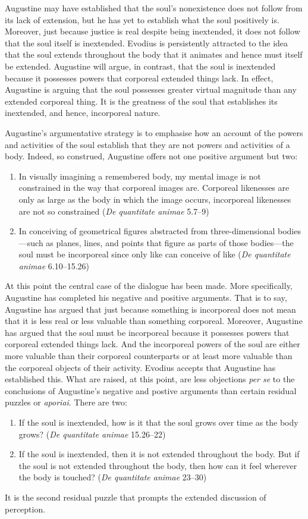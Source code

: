 \documentclass[12pt]{article}
\begin{document}
Augustine may have established that the soul’s nonexistence does not follow from its lack of extension, but he has yet to establish what the soul positively is. Moreover, just because justice is real despite being inextended, it does not follow that the soul itself is inextended. Evodius is persistently attracted to the idea that the soul extends throughout the body that it animates and hence must itself be extended. Augustine will argue, in contrast, that the soul is inextended because it possesses powers that corporeal extended things lack. In effect, Augustine is arguing that the soul possesses greater virtual magnitude than any extended corporeal thing. It is the greatness of the soul that establishes its inextended, and hence, incorporeal nature.

Augustine’s argumentative strategy is to emphasise how an account of the powers and activities of the soul establish that they are not powers and activities of a body. Indeed, so construed, Augustine offers not one positive argument but two:
\begin{enumerate}
	\item In visually imagining a remembered body, my mental image is not constrained in the way that corporeal images are. Corporeal likenesses are only as large as the body in which the image occurs, incorporeal likenesses are not so constrained (\emph{De quantitate animae} 5.7–9)
	\item In conceiving of geometrical figures abstracted from three-dimensional bodies—such as planes, lines, and points that figure as parts of those bodies—the soul must be incorporeal since only like can conceive of like (\emph{De quantitate animae} 6.10–15.26)
\end{enumerate}

At this point the central case of the dialogue has been made. More specifically, Augustine has completed his negative and positive arguments. That is to say, Augustine has argued that just because something is incorporeal does not mean that it is less real or less valuable than something corporeal. Moreover, Augustine has argued that the soul must be incorporeal because it possesses powers that corporeal extended things lack. And the incorporeal powers of the soul are either more valuable than their corporeal counterparts or at least more valuable than the corporeal objects of their activity. Evodius accepts that Augustine has established this. What are raised, at this point, are less objections \emph{per se} to the conclusions of Augustine's negative and postive arguments than certain residual puzzles or \emph{aporiai}. There are two:
\begin{enumerate}
	\item If the soul is inextended, how is it that the soul grows over time as the body grows? (\emph{De quantitate animae} 15.26–22)
	\item If the soul is inextended, then it is not extended throughout the body. But if the soul is not extended throughout the body, then how can it feel wherever the body is touched? (\emph{De quantitate animae} 23–30)
\end{enumerate}
It is the second residual puzzle that prompts the extended discussion of perception.
	
\end{document}
